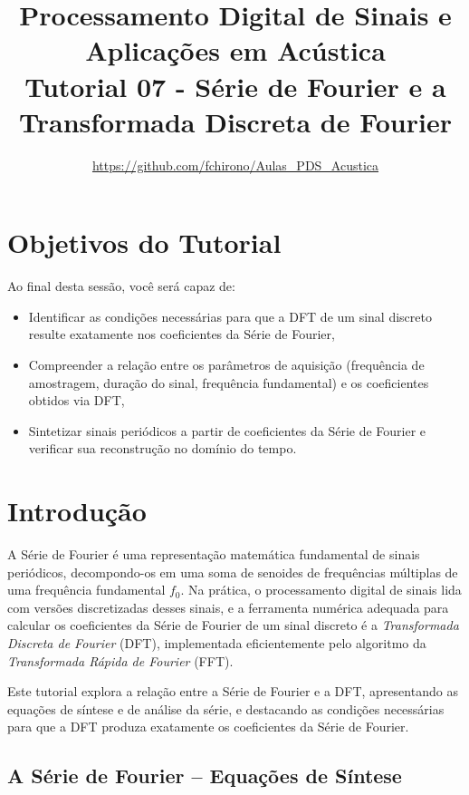 \documentclass[a4paper,twoside,12pt]{article}
\title{\vspace{-2cm} Processamento Digital de Sinais e Aplicações em Acústica\\ Tutorial 07 - Série de Fourier e a Transformada Discreta de Fourier}
\author{\url{https://github.com/fchirono/Aulas_PDS_Acustica}}
\begin{document}
	\date{}
	\maketitle
	
	\section*{Objetivos do Tutorial}
	Ao final desta sessão, você será capaz de:
	\begin{itemize}
		\item Identificar as condições necessárias para que a DFT de um sinal discreto resulte exatamente nos coeficientes da Série de Fourier,
		\item Compreender a relação entre os parâmetros de aquisição (frequência de amostragem, duração do sinal, frequência fundamental) e os coeficientes obtidos via DFT,
		\item Sintetizar sinais periódicos a partir de coeficientes da Série de Fourier e verificar sua reconstrução no domínio do tempo.
	\end{itemize}
	
	\begingroup
	\let\clearpage\relax
	\tableofcontents
	\endgroup
	
	
	\section{Introdução}
	\label{sec:intro}
	
	A Série de Fourier é uma representação matemática fundamental de sinais periódicos, decompondo-os em uma soma de senoides de frequências múltiplas de uma frequência fundamental $f_0$. Na prática, o processamento digital de sinais lida com versões discretizadas desses sinais, e a ferramenta numérica adequada para calcular os coeficientes da Série de Fourier de um sinal discreto é a \emph{Transformada Discreta de Fourier} (DFT), implementada eficientemente pelo algoritmo da \emph{Transformada Rápida de Fourier} (FFT).
	
	Este tutorial explora a relação entre a Série de Fourier e a DFT, apresentando as equações de síntese e de análise da série, e destacando as condições necessárias para que a DFT produza exatamente os coeficientes da Série de Fourier.
	
	\subsection{A Série de Fourier -- Equações de Síntese}
	
\end{document}
